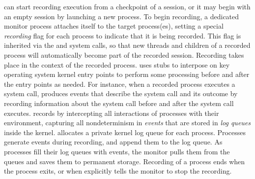 \scribe{} can start recording execution from a checkpoint of a
session, or it may begin with an empty session by launching a new
process.  To begin recording, a dedicated monitor process attaches
itself to the target process(es), setting a special {\em recording}
flag for each process to indicate that it is being recorded.  This flag is 
inherited via the  and  system calls, so that
new threads and children of a recorded process will automatically
become part of the recorded session.  Recording takes place in the
context of the recorded process.  \scribe{} uses
stubs to interpose on key operating system kernel entry points to
perform some processing before and after the entry points as needed.
For instance, when a recorded process executes a 
system call, \scribe{} produces events that describe the system
call and its outcome by recording information about the system call
before and after the system call executes.
\scribe{} records by intercepting all
interactions of processes with their environment, capturing
all nondeterminism in {\em events} that are stored in {\em log queues}
inside the kernel.  \scribe{} allocates a private kernel log queue for
each process.  Processes generate events during recording, and
append them to the log queue.  As processes fill their log queues
with events, the monitor pulls them from the queues and
saves them to permanent storage. Recording of a process ends when
the process exits, or when \scribe{} explicitly tells the monitor to
stop the recording.  

